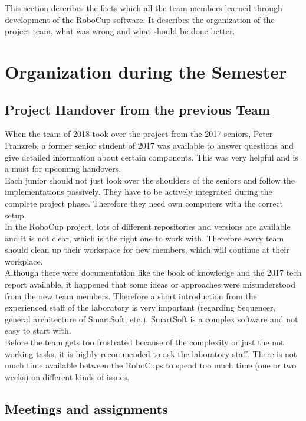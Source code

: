 This section describes the facts which all the team members learned through development of the RoboCup software. It describes the organization of the
project team, what was wrong and what should be done better.

\section{Organization during the Semester}

\subsection{Project Handover from the previous Team}

When the team of 2018 took over the project from the 2017 seniors, Peter Franzreb, a former senior student of 2017 was available to answer questions and give detailed information about certain components. This was very helpful and is a must for upcoming handovers. \\

Each junior should not just look over the shoulders of the seniors and follow the implementations passively. They have to be actively integrated during the complete project phase. Therefore they need own computers with the correct setup. \\

In the RoboCup project, lots of different repositories and versions are available and it is not clear, which is the right one to work with. Therefore every team should clean up their workspace for new members, which will continue at their workplace. \\

Although there were documentation like the book of knowledge \cite{BOK} and the 2017 tech report \cite{TR17} available, it happened that some ideas or approaches were misunderstood from the new team members. Therefore a short introduction from the experienced staff of the laboratory is very important (regarding Sequencer, general architecture of SmartSoft, etc.). SmartSoft is a complex software and not easy to start with.\\

Before the team gets too frustrated because of the complexity or just the not working tasks, it is highly recommended to ask the laboratory staff. There is not much time available between the RoboCups to spend too much time (one or two weeks) on different kinds of issues.

\subsection{Meetings and assignments}


